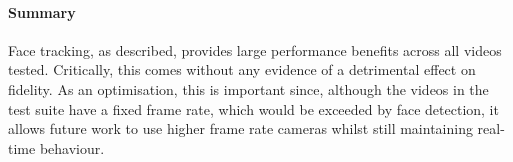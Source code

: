 

\paragraph{Summary}

Face tracking, as described, provides large performance benefits across all videos tested.
Critically, this comes without any evidence of a detrimental effect on fidelity. As an optimisation, this
is important since, although the videos in the test suite have a fixed frame rate, which would be exceeded by face detection, it allows future work to 
use higher frame rate cameras whilst still maintaining real-time behaviour. 

